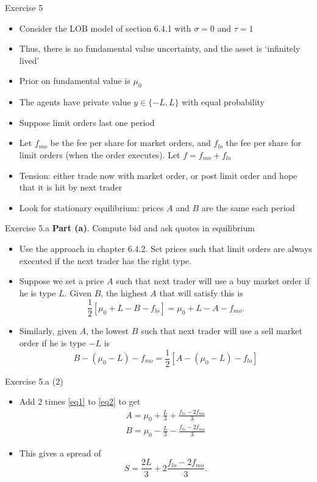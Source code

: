 \documentclass[english,10pt]{beamer}
\begin{document}
\begin{frame}[label=ex5]{Exercise 5}
	\begin{itemize}
		\item Consider the LOB model of section 6.4.1 with $\sigma=0$ and $\tau=1$
		\item Thus, there is no fundamental value uncertainty, and the asset is `infinitely lived'
		\item Prior on fundamental value is $\mu_0$
		\item The agents have private value $y \in \{-L,L\}$ with equal probability
		\item Suppose limit orders last one period
		\item Let $f_{mo}$ be the fee per share for market orders, and $f_{lo}$ the fee per share for limit orders (when the order executes). Let $f=f_{mo}+f_{lo}$
		\item Tension: either trade now with market order, or post limit order and hope that it is hit by next trader
		\item Look for stationary equilibrium: prices $A$ and $B$ are the same each period
	\end{itemize}
\end{frame}


\begin{frame}{Exercise 5.a}
	\textbf{Part (a)}. Compute bid and ask quotes in equilibrium
	\smallskip
	\smallskip
	\begin{itemize}
		\item Use the approach in chapter 6.4.2. Set prices such that limit orders are always executed if the next trader has the right type.
		\item Suppose we set a price $A$ such that next trader will use a buy market order if he is type $L$. Given $B$, the highest $A$ that will satisfy this is
		\begin{equation}\label{eq1}
		\frac{1}{2}[\mu_0+L-B-f_{lo}]=\mu_0+L-A-f_{mo}.
		\end{equation}
		\item Similarly, given $A$, the lowest $B$ such that next trader will use a sell market order if he is type $-L$ is
		\begin{equation} \label{eq2}
		B-(\mu_0-L)-f_{mo}=\frac{1}{2}[A-(\mu_0-L)-f_{lo}]
		\end{equation}
	\end{itemize}
\end{frame}


\begin{frame}{Exercise 5.a (2)}
	\begin{itemize}
		\item Add 2 times \eqref{eq1} to \eqref{eq2} to get
		\begin{align*}
		A=\mu_0+\frac{L}{3}+\frac{f_{lo}-2f_{mo}}{3}\\
		B=\mu_0-\frac{L}{3}-\frac{f_{lo}-2f_{mo}}{3}
		\end{align*}
		\item This gives a spread of
		\[
		S=\frac{2L}{3}+2\frac{f_{lo}-2f_{mo}}{3}.
		\]
	\end{itemize}
\end{frame}
\end{document}
